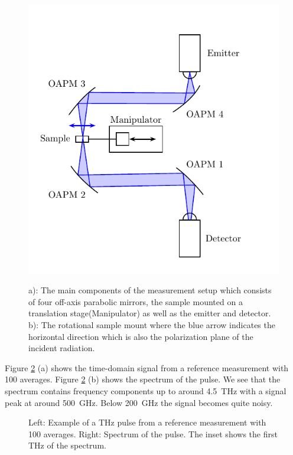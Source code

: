 \begin{figure}[H]
    \centering
    \subcaptionbox{\label{fig:1}}
        {\hspace*{-2em}\includegraphics[width=0.5\linewidth]{images/3_chapter03/Setup-THz-TDS-HHI.pdf}}
    \qquad
    \subcaptionbox{\label{fig:2}}
        {\hspace*{-2em}}
    
    \caption{a): The main components of the measurement setup which consists of four off-axis parabolic mirrors, the sample mounted on a translation stage(Manipulator) as well as the emitter and detector. b): The rotational sample mount where the blue arrow indicates the horizontal direction which is also the polarization plane of the incident radiation.}
    \label{fig:3_THz-TDS-HHI}
\end{figure}

Figure \ref{fig:HHI_pulse_example} (a) shows the time-domain signal from a reference measurement with 100 averages. Figure \ref{fig:HHI_pulse_example} (b) shows the spectrum of the pulse. We see that the spectrum contains frequency components up to around \SI{4.5}{\tera \hertz} with a signal peak at around \SI{500}{\giga \hertz}. Below \SI{200}{\giga \hertz} the signal becomes quite noisy.

\begin{figure}[H]
    \centering
    
    \caption{Left: Example of a THz pulse from a reference measurement with 100 averages. Right: Spectrum of the pulse. The inset shows the first \si{\tera \hertz} of the spectrum.}
    \label{fig:HHI_pulse_example}
\end{figure}

